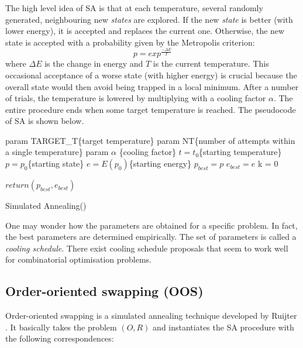 \documentclass[hyp]{socreport}
\begin{document}
The high level idea of SA is that at each temperature, several randomly generated, neighbouring new \textit{states} are explored. If the new \textit{state} is better (with lower energy), it is accepted and replaces the current one. Otherwise, the new state is accepted with a probability given by the Metropolis criterion:
\[p = exp^{\frac{-\Delta E}{T}}\]
where $\Delta E$ is the change in energy and $T$ is the current temperature. This occasional acceptance of a worse state (with higher energy) is crucial because the overall state would then avoid being trapped in a local minimum. After a number of trials, the temperature is lowered by multiplying with a cooling factor $\alpha$. The entire procedure ends when some target temperature is reached. The pseudocode of SA is shown below.

\singlespacing
\begin{procedure}[H]
\SetAlgoLined
{}
 param TARGET\_T\{target temperature\}\;
 param NT\{number of attempts within a single temperature\}\;
 param $\alpha$ \{cooling factor\}\;
 $t = t_0$\{starting temperature\}\;
 $p = p_0$\{starting state\}\;
 $e = E(p_0)$\{starting energy\}\;
 $p_{best} = p$\;
 $e_{best} = e$\;
 k = 0\;
 
 $return (p_{best}, e_{best})$\;
 \caption{Simulated Annealing()}
\end{procedure}
\normalspacing
\bigskip
One may wonder how the parameters are obtained for a specific problem. In fact, the best parameters are determined empirically. The set of parameters is called a \textit{cooling schedule}. There exist cooling schedule proposals that seem to work well for combinatorial optimisation problems.

\subsection{Order-oriented swapping (OOS)}
Order-oriented swapping is a simulated annealing technique developed by Ruijter \cite{Ruijter:2007}. It basically takes the problem $(O,R)$ and instantiates the SA procedure with the following correspondences:
\end{document}
